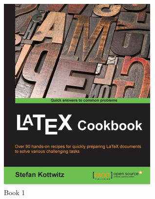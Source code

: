 \documentclass[a4paper,twoside,10pt]{article}
\begin{document}
	\begin{figure}
		\centering
		\begin{subfigure}{0.4\linewidth}
			\includegraphics[width=\linewidth]{img/img1.png}
			\caption{Book 1}
		\end{subfigure}	
		\begin{subfigure}{0.4\linewidth}

\end{subfigure}
\end{figure}
\end{document}
